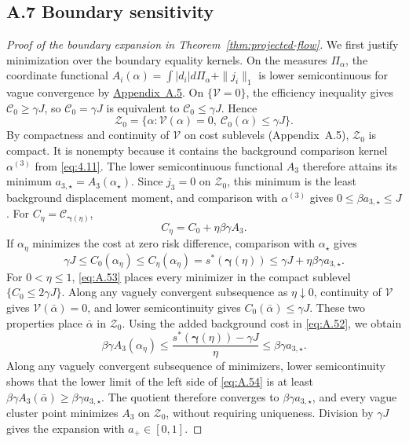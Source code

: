 \subsection{A.7 Boundary sensitivity}\label{app:boundary-sensitivity}

\leavevmode{}\label{proof:boundary-expansion}
\begin{proof}[Proof of the boundary expansion in Theorem~\ref{thm:projected-flow}] We first justify minimization over the boundary equality kernels. On the measures \(\Pi_\alpha\), the coordinate functional \(A_i(\alpha)=\int|d_i|d\Pi_\alpha+\|j_i\|_1\) is lower semicontinuous for vague convergence by \mbox{\hyperref[app:variational-proof]{Appendix~A.5}}. On \(\{\mathcal V=0\}\), the efficiency inequality gives \(\mathcal C_0\ge\gamma J\), so \(\mathcal C_0=\gamma J\) is equivalent to \(\mathcal C_0\le\gamma J\). Hence
\[
\mathcal Z_0=\{\alpha:\mathcal V(\alpha)=0,\ \mathcal C_0(\alpha)\le\gamma J\}.
\]
By compactness and continuity of \(\mathcal V\) on cost sublevels (Appendix~A.5), \(\mathcal Z_0\) is compact. It is nonempty because it contains the background comparison kernel \(\alpha^{(3)}\) from \eqref{eq:4.11}. The lower semicontinuous functional \(A_3\) therefore attains its minimum \(a_{3,\star}=A_3(\alpha_\star)\). Since \(j_3=0\) on \(\mathcal Z_0\), this minimum is the least background displacement moment, and comparison with \(\alpha^{(3)}\) gives \(0\le\beta a_{3,\star}\le J\). For \(C_\eta=\mathcal C_{\boldsymbol\gamma(\eta)}\),
\begin{equation}
C_\eta=C_0+\eta\beta\gamma A_3.
\tag{A.52}\label{eq:A.52}
\end{equation}
If \(\alpha_\eta\) minimizes the cost at zero risk difference, comparison with \(\alpha_\star\) gives
\begin{equation}
\gamma J\le C_0(\alpha_\eta)\le C_\eta(\alpha_\eta)
=s^*(\boldsymbol\gamma(\eta))
\le\gamma J+\eta\beta\gamma a_{3,\star}.
\tag{A.53}\label{eq:A.53}
\end{equation}
For \(0<\eta\le1\), \eqref{eq:A.53} places every minimizer in the compact sublevel \(\{C_0\le2\gamma J\}\). Along any vaguely convergent subsequence as \(\eta\downarrow0\), continuity of \(\mathcal V\) gives \(\mathcal V(\bar\alpha)=0\), and lower semicontinuity gives \(C_0(\bar\alpha)\le\gamma J\). These two properties place \(\bar\alpha\) in \(\mathcal Z_0\). Using the added background cost in \eqref{eq:A.52}, we obtain
\begin{equation}
\beta\gamma A_3(\alpha_\eta)
\le\frac{s^*(\boldsymbol\gamma(\eta))-\gamma J}{\eta}
\le\beta\gamma a_{3,\star}.
\tag{A.54}\label{eq:A.54}
\end{equation}
Along any vaguely convergent subsequence of minimizers, lower semicontinuity shows that the lower limit of the left side of \eqref{eq:A.54} is at least \(\beta\gamma A_3(\bar\alpha)\ge\beta\gamma a_{3,\star}\). The quotient therefore converges to \(\beta\gamma a_{3,\star}\), and every vague cluster point minimizes \(A_3\) on \(\mathcal Z_0\), without requiring uniqueness. Division by \(\gamma J\) gives the expansion with \(a_+\in[0,1]\). \end{proof}
